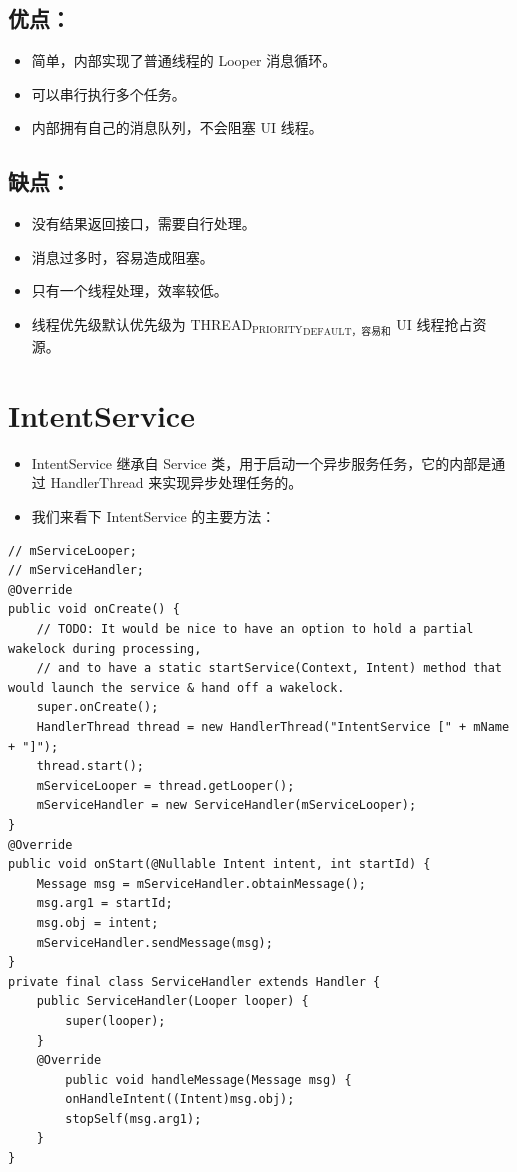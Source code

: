 \documentclass[9pt, b5paper]{article}
\begin{document}
\subsection{优点：}
\label{sec-4-1}
\begin{itemize}
\item 简单，内部实现了普通线程的 Looper 消息循环。
\item 可以串行执行多个任务。
\item 内部拥有自己的消息队列，不会阻塞 UI 线程。
\end{itemize}
\subsection{缺点：}
\label{sec-4-2}
\begin{itemize}
\item 没有结果返回接口，需要自行处理。
\item 消息过多时，容易造成阻塞。
\item 只有一个线程处理，效率较低。
\item 线程优先级默认优先级为 THREAD$_{\text{PRIORITY}}$$_{\text{DEFAULT，容易和}}$ UI 线程抢占资源。
\end{itemize}

\section{IntentService}
\label{sec-5}
\begin{itemize}
\item IntentService 继承自 Service 类，用于启动一个异步服务任务，它的内部是通过 HandlerThread 来实现异步处理任务的。
\item 我们来看下 IntentService 的主要方法：
\end{itemize}
\begin{verbatim}
// mServiceLooper;
// mServiceHandler;
@Override
public void onCreate() {
    // TODO: It would be nice to have an option to hold a partial wakelock during processing,
    // and to have a static startService(Context, Intent) method that would launch the service & hand off a wakelock.
    super.onCreate();
    HandlerThread thread = new HandlerThread("IntentService [" + mName + "]");
    thread.start();
    mServiceLooper = thread.getLooper();
    mServiceHandler = new ServiceHandler(mServiceLooper);
}
@Override
public void onStart(@Nullable Intent intent, int startId) {
    Message msg = mServiceHandler.obtainMessage();
    msg.arg1 = startId;
    msg.obj = intent;
    mServiceHandler.sendMessage(msg);
}
private final class ServiceHandler extends Handler {
    public ServiceHandler(Looper looper) {
        super(looper);
    }
    @Override
        public void handleMessage(Message msg) {
        onHandleIntent((Intent)msg.obj);
        stopSelf(msg.arg1);
    }
}
\end{verbatim}
\end{document}
